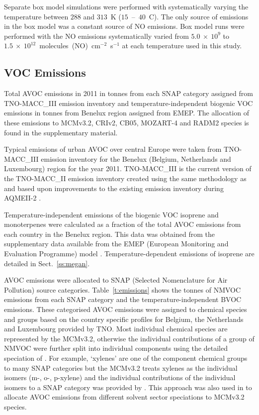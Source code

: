 Separate box model simulations were performed with systematically varying the temperature between $288$ and $313$~K ($15$~--~$40$~\degree C). 
The only source of  emissions in the box model was a constant source of NO emissions. 
Box model runs were performed with the NO emissions systematically varied from $5.0~\times~10^9$ to $1.5~\times~10^{12}$~molecules~(NO)~cm$^{-2}$~s$^{-1}$ at each temperature used in this study. 

\subsection{VOC Emissions} \label{ss:VOC_emissions}
{%
    \renewcommand{\arraystretch}{1.1}%
    \begin{table}%
        \centering%
        \caption{Total AVOC emissions in 2011 in tonnes from each SNAP category assigned from TNO-MACC\_III emission inventory and temperature-independent biogenic VOC emissions in tonnes from Benelux region assigned from EMEP. The allocation of these emissions to MCMv3.2, CRIv2, CB05, MOZART-4 and RADM2 species is found in the supplementary material.}%
        \label{t:emissions}%
    \end{table}%
}
Typical emissions of urban AVOC over central Europe were taken from TNO-MACC\_III emission inventory for the Benelux (Belgium, Netherlands and Luxembourg) region for the year 2011.
TNO-MACC\_III is the current version of the TNO-MACC\_II emission inventory created using the same methodology as \citet{Kuenen:2014} and based upon improvements to the existing emission inventory during AQMEII-2 \citep{Pouliot:2015}. 

Temperature-independent emissions of the biogenic VOC isoprene and monoterpenes were calculated as a fraction of the total AVOC emissions from each country in the Benelux region.
This data was obtained from the supplementary data available from the EMEP (European Monitoring and Evaluation Programme) model \citep{Simpson:2012}.
Temperature-dependent emissions of isoprene are detailed in Sect.~\ref{ss:megan}.

AVOC emissions were allocated to SNAP (Selected Nomenclature for Air Pollution) source categories.
Table~\ref{t:emissions} shows the tonnes of NMVOC emissions from each SNAP category and the temperature-independent BVOC emissions.
These categorised AVOC emissions were assigned to chemical species and groups based on the country specific profiles for Belgium, the Netherlands and Luxembourg provided by TNO.
Most individual chemical species are represented by the MCMv3.2, otherwise the individual contributions of a group of NMVOC were further split into individual components using the detailed speciation of \citet{Passant:2002}.
For example, `xylenes' are one of the component chemical groups to many SNAP categories but the MCMv3.2 treats xylenes as the individual isomers (m-, o-, p-xylene) and the individual contributions of the individual isomers to a SNAP category was provided by \citet{Passant:2002}.
This approach was also used in \citet{vonSchneidemesser:2015} to allocate AVOC emissions from different solvent sector speciations to MCMv3.2 species.

